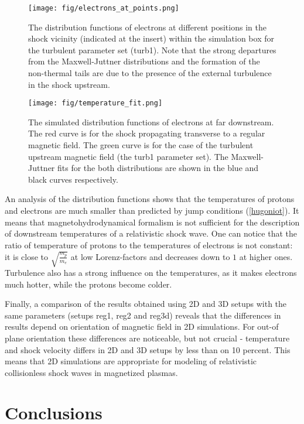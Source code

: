 \documentclass[a4paper]{jpconf}
\begin{document}
	\begin{figure}[h!]
		\centering
		\texttt{[image: fig/electrons\_at\_points.png]} 
		\caption{The distribution functions of electrons at different positions in the shock vicinity (indicated at the insert) within the simulation box for the  turbulent parameter set (turb1). Note that the strong departures from the Maxwell-Juttner distributions and the formation of the non-thermal tails are due to the presence of the external turbulence in the shock upstream.}
		\label{points}
	\end{figure}
	
	\begin{figure}[h!]
		\centering
		\texttt{[image: fig/temperature\_fit.png]} 
		\caption{The simulated distribution functions of electrons at far downstream. The red curve is for the shock propagating transverse to a regular magnetic field. The green curve is for the case of the turbulent upstream magnetic field (the turb1 parameter set). The Maxwell-Juttner fits for the both distributions are shown in the blue and black curves respectively.}
		\label{temp_fit}
	\end{figure}
	
	An analysis of the distribution functions shows that the temperatures of protons and electrons are much smaller than predicted by jump conditions (\ref{hugoniot}). It means that magnetohydrodynamical formalism is not sufficient for the description of downstream temperatures of a relativistic shock wave. One can notice that the ratio of temperature of protons to the temperatures of electrons is not constant: it is close to $\sqrt{\frac{m_p}{m_e}}$ at low Lorenz-factors and decreases down to $1$ at higher ones. Turbulence also has a strong influence on the temperatures, as it makes electrons much hotter, while the protons become colder. 
	
	Finally, a comparison of the results obtained using 2D and 3D setups with the same parameters (setups reg1, reg2 and reg3d) reveals that the differences in results depend on orientation of magnetic field in 2D simulations. For out-of plane orientation these differences are noticeable, but not crucial - temperature and shock velocity differs in 2D and 3D setups by less than on 10 percent. This means that 2D simulations are appropriate for modeling of relativistic collisionless shock waves in magnetized plasmas. 
	
	\section{Conclusions}
	
\end{document}
